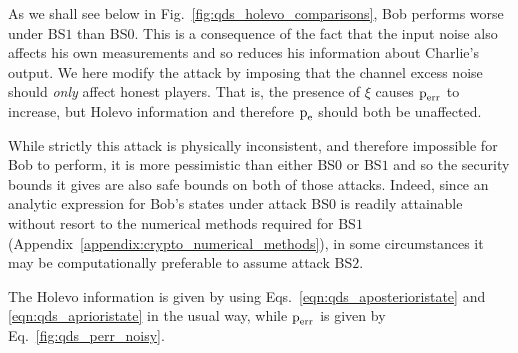 As we shall see below in Fig.~\ref{fig:qds_holevo_comparisons}, Bob performs worse under BS$1$ than BS$0$. This is a consequence of the fact that the input noise also affects his own measurements and so reduces his information about Charlie's output. We here modify the attack by imposing that the channel excess noise should \emph{only} affect honest players. That is, the presence of $\xi$ causes $\text{p}_{\text{err}}$ to increase, but Holevo information and therefore $\text{p}_{\text{e}}$ should both be unaffected. 

While strictly this attack is physically inconsistent, and therefore impossible for Bob to perform, it is more pessimistic than either BS$0$ or BS$1$ and so the security bounds it gives are also safe bounds on both of those attacks. Indeed, since an analytic expression for Bob's states under attack BS$0$ is readily attainable without resort to the numerical methods required for BS$1$ (Appendix~\ref{appendix:crypto_numerical_methods}), in some circumstances it may be computationally preferable to assume attack BS$2$.

The Holevo information is given by using Eqs.~\ref{eqn:qds_aposterioristate} and \ref{eqn:qds_aprioristate} in the usual way, while $\text{p}_{\text{err}}$ is given by Eq.~\ref{fig:qds_perr_noisy}. 





